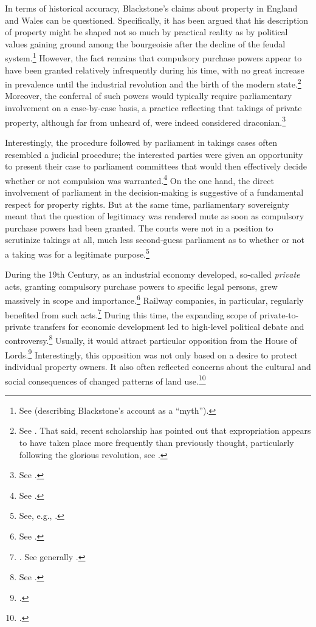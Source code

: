 In terms of historical accuracy, Blackstone's claims about property in England and Wales can be questioned. Specifically, it has been argued that his description of property might be shaped not so much by practical reality as by political values gaining ground among the bourgeoisie after the decline of the feudal system.\footnote{See \cite[34-35]{waring09} (describing Blackstone's account as a ``myth'').} However, the fact remains that compulsory purchase powers appear to have been granted relatively infrequently during his time, with no great increase in prevalence until the industrial revolution and the birth of the modern state.\footnote{See \cite[15]{allen00}. That said, recent scholarship has pointed out that expropriation appears to have taken place more frequently than previously thought, particularly following the glorious revolution, see \cite{hoppit11}.} Moreover, the conferral of such powers would typically require parliamentary involvement on a case-by-case basis, a practice reflecting that takings of private property, although far from unheard of, were indeed considered draconian.\footnote{See \cite[43-46]{nulty12}.}

Interestingly, the procedure followed by parliament in takings cases often resembled a judicial procedure; the interested parties were given an opportunity to present their case to parliament committees that would then effectively decide whether or not compulsion was warranted.\footnote{See \cite[13-16]{allen00}.} On the one hand, the direct involvement of parliament in the decision-making is suggestive of a fundamental respect for property rights. But at the same time, parliamentary sovereignty meant that the question of legitimacy was rendered mute as soon as compulsory purchase powers had been granted. The courts were not in a position to scrutinize takings at all, much less second-guess parliament as to whether or not a taking was for a legitimate purpose.\footnote{See, e.g., \cite[643]{nulty12}.}

During the 19th Century, as an industrial economy developed, so-called {\it private} acts, granting compulsory purchase powers to specific legal persons, grew massively in scope and importance.\footnote{See \cite[204]{allen00}.} Railway companies, in particular, regularly benefited from such acts.\footnote{\cite[204]{allen00}. See generally \cite{kostal97}.} During this time, the expanding scope of private-to-private transfers for economic development led to high-level political debate and controversy.\footnote{See \cite[204]{allen00}.} Usually, it would attract particular opposition from the House of Lords.\footcite[204]{allen00} Interestingly, this opposition was not only based on a desire to protect individual property owners. It also often reflected concerns about the cultural and social consequences of changed patterns of land use.\footcite[204]{allen00}

